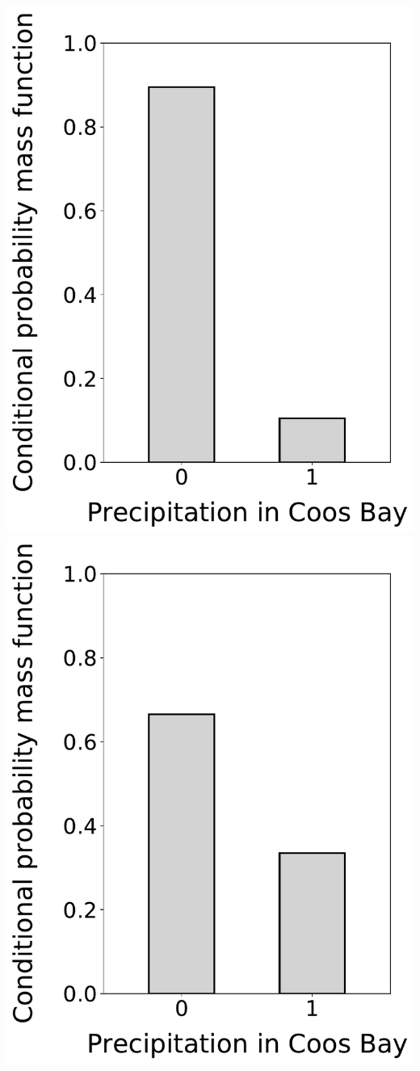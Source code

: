 \documentclass[12pt,twoside]{article}
\begin{document}
\begin{enumerate}
\includegraphics[scale=.5]{precipitation_cond_pmf_2_given_3eq0.pdf}
\includegraphics[scale=.5]{precipitation_cond_pmf_2_given_3eq1.pdf}

\end{enumerate}
\end{document}

